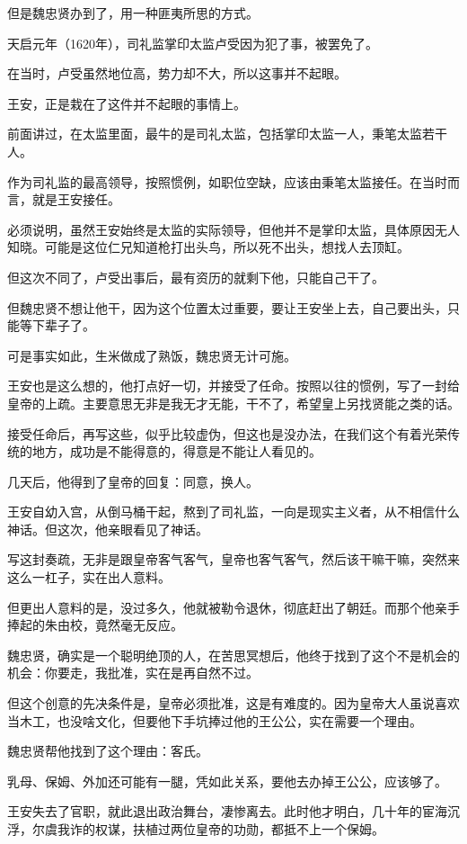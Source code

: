 \begin{multicols}{\theparacolNo}
但是魏忠贤办到了，用一种匪夷所思的方式。

天启元年（1620年），司礼监掌印太监卢受因为犯了事，被罢免了。

在当时，卢受虽然地位高，势力却不大，所以这事并不起眼。

王安，正是栽在了这件并不起眼的事情上。

前面讲过，在太监里面，最牛的是司礼太监，包括掌印太监一人，秉笔太监若干人。

作为司礼监的最高领导，按照惯例，如职位空缺，应该由秉笔太监接任。在当时而言，就是王安接任。

必须说明，虽然王安始终是太监的实际领导，但他并不是掌印太监，具体原因无人知晓。可能是这位仁兄知道枪打出头鸟，所以死不出头，想找人去顶缸。

但这次不同了，卢受出事后，最有资历的就剩下他，只能自己干了。

但魏忠贤不想让他干，因为这个位置太过重要，要让王安坐上去，自己要出头，只能等下辈子了。

可是事实如此，生米做成了熟饭，魏忠贤无计可施。

王安也是这么想的，他打点好一切，并接受了任命。按照以往的惯例，写了一封给皇帝的上疏。主要意思无非是我无才无能，干不了，希望皇上另找贤能之类的话。

接受任命后，再写这些，似乎比较虚伪，但这也是没办法，在我们这个有着光荣传统的地方，成功是不能得意的，得意是不能让人看见的。

几天后，他得到了皇帝的回复：同意，换人。

王安自幼入宫，从倒马桶干起，熬到了司礼监，一向是现实主义者，从不相信什么神话。但这次，他亲眼看见了神话。

写这封奏疏，无非是跟皇帝客气客气，皇帝也客气客气，然后该干嘛干嘛，突然来这么一杠子，实在出人意料。

但更出人意料的是，没过多久，他就被勒令退休，彻底赶出了朝廷。而那个他亲手捧起的朱由校，竟然毫无反应。

魏忠贤，确实是一个聪明绝顶的人，在苦思冥想后，他终于找到了这个不是机会的机会：你要走，我批准，实在是再自然不过。

但这个创意的先决条件是，皇帝必须批准，这是有难度的。因为皇帝大人虽说喜欢当木工，也没啥文化，但要他下手坑捧过他的王公公，实在需要一个理由。

魏忠贤帮他找到了这个理由：客氏。

乳母、保姆、外加还可能有一腿，凭如此关系，要他去办掉王公公，应该够了。

王安失去了官职，就此退出政治舞台，凄惨离去。此时他才明白，几十年的宦海沉浮，尔虞我诈的权谋，扶植过两位皇帝的功勋，都抵不上一个保姆。


\end{multicols}
